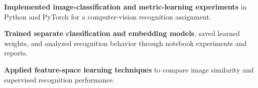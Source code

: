 \begin{bullets}
    \item \textbf{Implemented image-classification and metric-learning experiments} in Python and PyTorch for a computer-vision recognition assignment.
    \item \textbf{Trained separate classification and embedding models}, saved learned weights, and analyzed recognition behavior through notebook experiments and reports.
    \item \textbf{Applied feature-space learning techniques} to compare image similarity and supervised recognition performance.
\end{bullets}